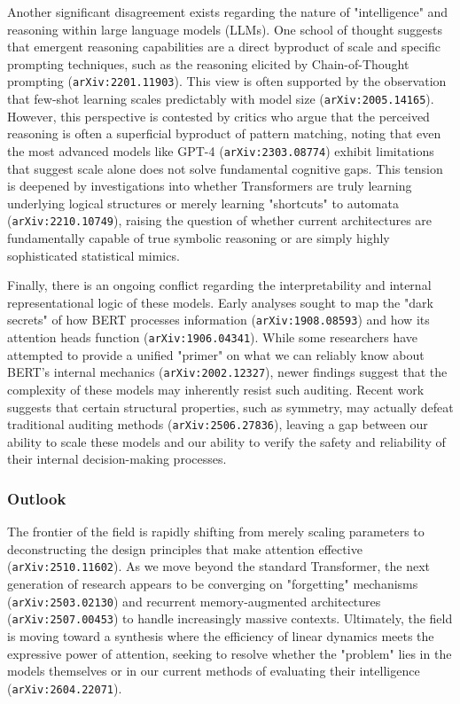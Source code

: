 \documentclass[11pt]{article}
\begin{document}
Another significant disagreement exists regarding the nature of "intelligence" and reasoning within large language models (LLMs). One school of thought suggests that emergent reasoning capabilities are a direct byproduct of scale and specific prompting techniques, such as the reasoning elicited by Chain-of-Thought prompting (\texttt{arXiv:2201.11903}). This view is often supported by the observation that few-shot learning scales predictably with model size (\texttt{arXiv:2005.14165}). However, this perspective is contested by critics who argue that the perceived reasoning is often a superficial byproduct of pattern matching, noting that even the most advanced models like GPT-4 (\texttt{arXiv:2303.08774}) exhibit limitations that suggest scale alone does not solve fundamental cognitive gaps. This tension is deepened by investigations into whether Transformers are truly learning underlying logical structures or merely learning "shortcuts" to automata (\texttt{arXiv:2210.10749}), raising the question of whether current architectures are fundamentally capable of true symbolic reasoning or are simply highly sophisticated statistical mimics.

Finally, there is an ongoing conflict regarding the interpretability and internal representational logic of these models. Early analyses sought to map the "dark secrets" of how BERT processes information (\texttt{arXiv:1908.08593}) and how its attention heads function (\texttt{arXiv:1906.04341}). While some researchers have attempted to provide a unified "primer" on what we can reliably know about BERT’s internal mechanics (\texttt{arXiv:2002.12327}), newer findings suggest that the complexity of these models may inherently resist such auditing. Recent work suggests that certain structural properties, such as symmetry, may actually defeat traditional auditing methods (\texttt{arXiv:2506.27836}), leaving a gap between our ability to scale these models and our ability to verify the safety and reliability of their internal decision-making processes.

\subsubsection{Outlook}

The frontier of the field is rapidly shifting from merely scaling parameters to deconstructing the design principles that make attention effective (\texttt{arXiv:2510.11602}). As we move beyond the standard Transformer, the next generation of research appears to be converging on "forgetting" mechanisms (\texttt{arXiv:2503.02130}) and recurrent memory-augmented architectures (\texttt{arXiv:2507.00453}) to handle increasingly massive contexts. Ultimately, the field is moving toward a synthesis where the efficiency of linear dynamics meets the expressive power of attention, seeking to resolve whether the "problem" lies in the models themselves or in our current methods of evaluating their intelligence (\texttt{arXiv:2604.22071}).
\end{document}
